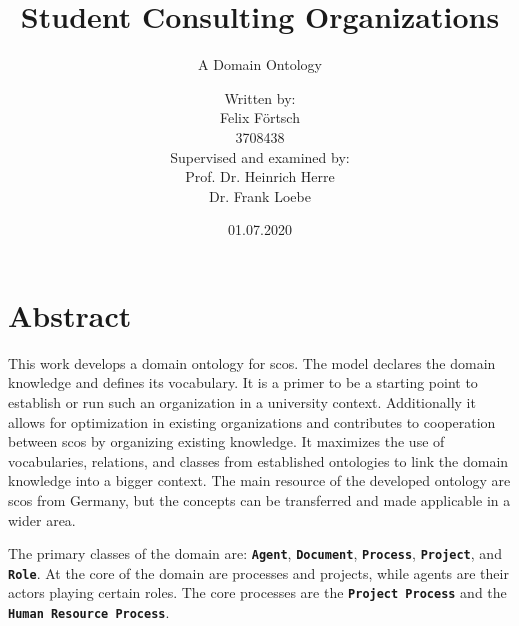 \documentclass[a4paper, DIV=13, BCOR=0cm]{scrbook}
\newcommand{\class}[1]{\texttt{\textbf{#1}}}
\begin{document}
\titlehead{
	Document Version: v20 \\
	Overall Progress: 
}
\subject{Bachelor's Thesis}
\title{Student Consulting Organizations}
\subtitle{A Domain Ontology}
\author{Written by: \\ Felix Förtsch \\ 3708438 \vspace{1cm} \\
	Supervised and examined by: \\
	Prof. Dr. Heinrich Herre \\
	Dr. Frank Loebe \vspace{0.5cm}}
\date{01.07.2020}
\publishers{Leipzig University}
\maketitle

\frontmatter
\chapter*{Abstract}
	This work develops a domain ontology for \glspl{sco}. The model declares the domain knowledge and defines its vocabulary. It is a primer to be a starting point to establish or run such an organization in a university context. Additionally it allows for optimization in existing organizations and contributes to cooperation between \glspl{sco} by organizing existing knowledge. It maximizes the use of vocabularies, relations, and classes from established ontologies to link the domain knowledge into a bigger context. The main resource of the developed ontology are \glspl{sco} from Germany, but the concepts can be transferred and made applicable in a wider area.
	
	The primary classes of the domain are: \class{Agent}, \class{Document}, \class{Process}, \class{Project}, and \class{Role}. At the core of the domain are processes and projects, while agents are their actors playing certain roles. The core processes are the \class{Project Process} and the \class{Human Resource Process}.
	
\end{document}
